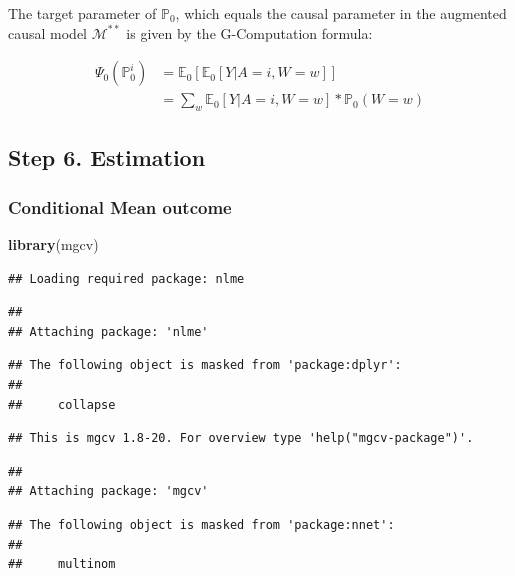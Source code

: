 \documentclass[]{article}
\newenvironment{Shaded}{\begin{snugshade}}{\end{snugshade}}
\newcommand{\KeywordTok}[1]{\textcolor[rgb]{0.13,0.29,0.53}{\textbf{#1}}}
\newcommand{\NormalTok}[1]{#1}
\begin{document}
The target parameter of \(\mathbb{P}_0\), which equals the causal
parameter in the augmented causal model \(\mathcal{M}^{**}\) is given by
the G-Computation formula:

\[
\begin{aligned}
\Psi_0(\mathbb{P}^i_0)&=\mathbb{E}_0[\mathbb{E}_0[Y|A= i,W=w]]\\
&= \sum_w\mathbb{E}_0[Y|A=i,W=w]*\mathbb{P}_0(W=w)
\end{aligned}
\]

\subsection{Step 6. Estimation}\label{step-6.-estimation}

\subsubsection{Conditional Mean outcome}\label{conditional-mean-outcome}

\begin{Shaded}
\begin{Highlighting}[]
\KeywordTok{library}\NormalTok{(mgcv)}
\end{Highlighting}
\end{Shaded}

\begin{verbatim}
## Loading required package: nlme
\end{verbatim}

\begin{verbatim}
## 
## Attaching package: 'nlme'
\end{verbatim}

\begin{verbatim}
## The following object is masked from 'package:dplyr':
## 
##     collapse
\end{verbatim}

\begin{verbatim}
## This is mgcv 1.8-20. For overview type 'help("mgcv-package")'.
\end{verbatim}

\begin{verbatim}
## 
## Attaching package: 'mgcv'
\end{verbatim}

\begin{verbatim}
## The following object is masked from 'package:nnet':
## 
##     multinom
\end{verbatim}
\end{document}
